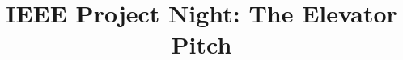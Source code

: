 \documentclass{memoir}
\begin{document}
\title{IEEE Project Night: The Elevator Pitch}
\maketitle
\end{document}
